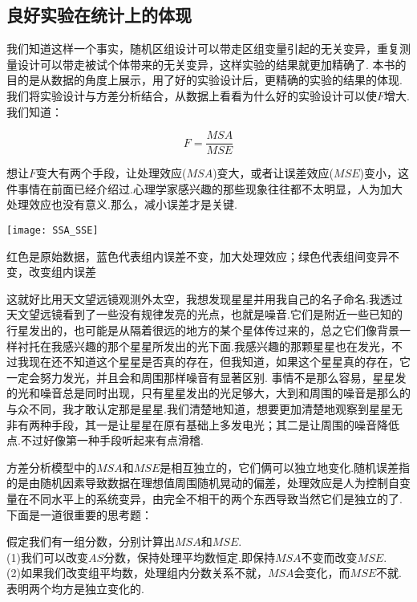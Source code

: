 \subsection{良好实验在统计上的体现}
我们知道这样一个事实，随机区组设计可以带走区组变量引起的无关变异，重复测量设计可以带走被试个体带来的无关变异，这样实验的结果就更加精确了.
本书的目的是从数据的角度上展示，用了好的实验设计后，更精确的实验的结果的体现.
我们将实验设计与方差分析结合，从数据上看看为什么好的实验设计可以使$F$增大.我们知道：

\[ F = \frac{MSA}{MSE} \]

想让$F$变大有两个手段，让处理效应($MSA$)变大，或者让误差效应($MSE$)变小，这件事情在前面已经介绍过.心理学家感兴趣的那些现象往往都不太明显，人为加大处理效应也没有意义.那么，减小误差才是关键.

\begin{marginfigure}
	\texttt{[image: SSA\_SSE]}
	\caption{红色是原始数据，蓝色代表组内误差不变，加大处理效应；绿色代表组间变异不变，改变组内误差}
\end{marginfigure}

这就好比用天文望远镜观测外太空，我想发现星星并用我自己的名子命名.我透过天文望远镜看到了一些没有规律发亮的光点，也就是噪音.它们是附近一些已知的行星发出的，也可能是从隔着很远的地方的某个星体传过来的，总之它们像背景一样衬托在我感兴趣的那个星星所发出的光下面.我感兴趣的那颗星星也在发光，不过我现在还不知道这个星星是否真的存在，但我知道，如果这个星星真的存在，它一定会努力发光，并且会和周围那样噪音有显著区别.
事情不是那么容易，星星发的光和噪音总是同时出现，只有星星发出的光足够大，大到和周围的噪音是那么的与众不同，我才敢认定那是星星.我们清楚地知道，想要更加清楚地观察到星星无非有两种手段，其一是让星星在原有基础上多发电光；其二是让周围的噪音降低点.不过好像第一种手段听起来有点滑稽.

方差分析模型中的$MSA$和$MSE$是相互独立的，它们俩可以独立地变化.随机误差指的是由随机因素导致数据在理想值周围随机晃动的偏差，处理效应是人为控制自变量在不同水平上的系统变异，由完全不相干的两个东西导致当然它们是独立的了.下面是一道很重要的思考题：

\begin{kaobox}[frametitle=思考]
假定我们有一组分数，分别计算出$MSA$和$MSE$.\\
(1)我们可以改变$AS$分数，保持处理平均数恒定.即保持$MSA$不变而改变$MSE$.\\
(2)如果我们改变组平均数，处理组内分数关系不就，$MSA$会变化，而$MSE$不就.表明两个均方是独立变化的.



\end{kaobox}

